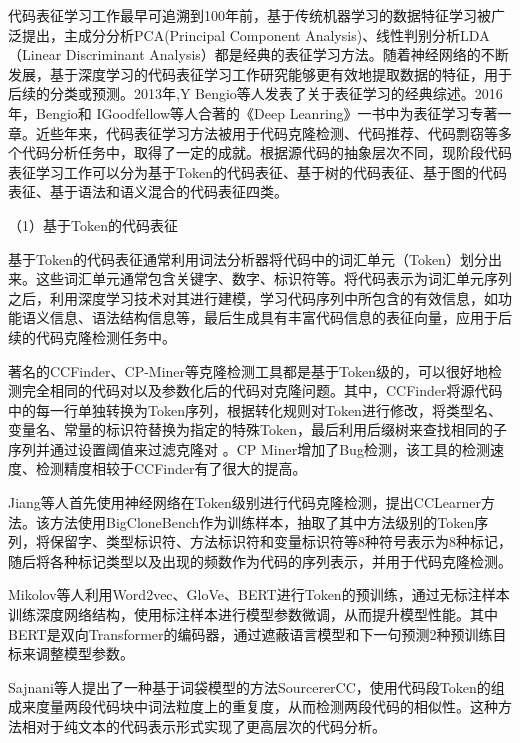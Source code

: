 代码表征学习工作最早可追溯到100年前，基于传统机器学习的数据特征学习被广泛提出，主成分分析PCA(Principal Component Analysis)\cite{WOS:000202849800065}、线性判别分析LDA（Linear Discriminant Analysis）\cite{2012THE}都是经典的表征学习方法。随着神经网络的不断发展，基于深度学习的代码表征学习工作研究能够更有效地提取数据的特征，用于后续的分类或预测。2013年,Y Bengio等人\cite{Bengio2013Representation}发表了关于表征学习的经典综述。2016年，Bengio和 IGoodfellow等人\cite{goodfellow2016deep}合著的《Deep Leanring》一书中为表征学习专著一章。近些年来，代码表征学习方法被用于代码克隆检测、代码推荐、代码剽窃等多个代码分析任务中，取得了一定的成就。根据源代码的抽象层次不同，现阶段代码表征学习工作可以分为基于Token的代码表征、基于树的代码表征、基于图的代码表征、基于语法和语义混合的代码表征四类。

（1）基于Token的代码表征

基于Token的代码表征通常利用词法分析器将代码中的词汇单元（Token）划分出来。这些词汇单元通常包含关键字、数字、标识符等。将代码表示为词汇单元序列之后，利用深度学习技术对其进行建模，学习代码序列中所包含的有效信息，如功能语义信息、语法结构信息等，最后生成具有丰富代码信息的表征向量，应用于后续的代码克隆检测任务中。

著名的CCFinder\cite{1019480}、CP-Miner\cite{1610609}等克隆检测工具都是基于Token级的，可以很好地检测完全相同的代码对以及参数化后的代码对克隆问题。其中，CCFinder将源代码中的每一行单独转换为Token序列，根据转化规则对Token进行修改，将类型名、变量名、常量的标识符替换为指定的特殊Token，最后利用后缀树来查找相同的子序列并通过设置阈值来过滤克隆对 。CP Miner增加了Bug检测，该工具的检测速度、检测精度相较于CCFinder有了很大的提高。

Jiang等人\cite{10.1145/1287624.1287634}首先使用神经网络在Token级别进行代码克隆检测，提出CCLearner方法。该方法使用BigCloneBench\cite{7332459}作为训练样本，抽取了其中方法级别的Token序列，将保留字、类型标识符、方法标识符和变量标识符等8种符号表示为8种标记，随后将各种标记类型以及出现的频数作为代码的序列表示，并用于代码克隆检测。

Mikolov等人\cite{pennington-etal-2014-glove}利用Word2vec、GloVe、BERT进行Token的预训练，通过无标注样本训练深度网络结构，使用标注样本进行模型参数微调，从而提升模型性能。其中BERT\cite{devlin-etal-2019-bert}是双向Transformer的编码器，通过遮蔽语言模型和下一句预测2种预训练目标来调整模型参数。

Sajnani等人\cite{7886988}提出了一种基于词袋模型的方法SourcererCC，使用代码段Token的组成来度量两段代码块中词法粒度上的重复度，从而检测两段代码的相似性。这种方法相对于纯文本的代码表示形式实现了更高层次的代码分析。

